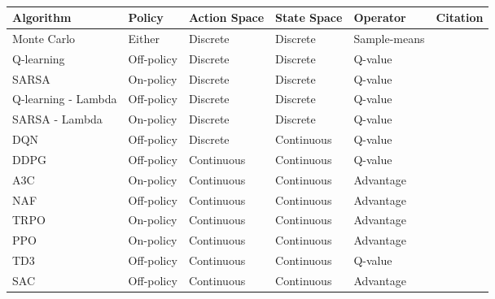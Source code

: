 \newpage\begin{table}[htp!]
    \renewcommand{\arraystretch}{1.4}
    \centering
    \caption{
        \textbf{}
    }
    \label{tab:rl:algorithms}
    \begin{tabularx}{\textwidth}{lllllX}
            \toprule
            Algorithm           & Policy       & Action Space & State Space & Operator     & Citation                     \\ 
            \midrule
            Monte Carlo         & Either       & Discrete     & Discrete    & Sample-means &                              \\
            Q-learning          & Off-policy   & Discrete     & Discrete    & Q-value      & \cite{Watkins1992}           \\
            SARSA               & On-policy    & Discrete     & Discrete    & Q-value      & \cite{Rummery1994}           \\
            Q-learning - Lambda & Off-policy   & Discrete     & Discrete    & Q-value      &                              \\
            SARSA - Lambda      & On-policy    & Discrete     & Discrete    & Q-value      &                              \\
            DQN                 & Off-policy   & Discrete     & Continuous  & Q-value      & \cite{Mnih2013, Hessel2017}  \\
            DDPG                & Off-policy   & Continuous   & Continuous  & Q-value      & \cite{Lillicrap2015}         \\
            A3C                 & On-policy    & Continuous   & Continuous  & Advantage    & \cite{Mnih2016}              \\
            NAF                 & Off-policy   & Continuous   & Continuous  & Advantage    &                              \\
            TRPO                & On-policy    & Continuous   & Continuous  & Advantage    & \cite{Schulman2015}          \\
            PPO                 & On-policy    & Continuous   & Continuous  & Advantage    & \cite{Schulman2017}          \\
            TD3                 & Off-policy   & Continuous   & Continuous  & Q-value      & \cite{Fujimoto2018}          \\
            SAC                 & Off-policy   & Continuous   & Continuous  & Advantage    & \cite{Haarnoja2018}          \\
            \bottomrule
    \end{tabularx}
\end{table}
    
